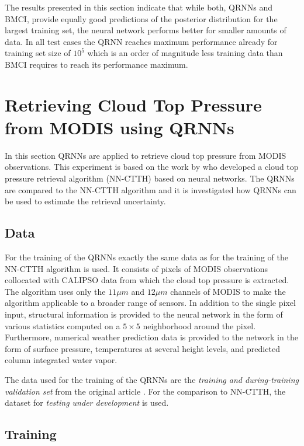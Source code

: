 \documentclass[journal abbreviation, manuscript]{copernicus}
\begin{document}
The results presented in this section indicate that while both, QRNNs and
BMCI, provide equally good predictions of the posterior distribution for the
largest training set, the neural network performs better for smaller amounts
of data. In all test cases the QRNN reaches maximum performance already for
training set size of $10^5$ which is an order of magnitude less training data
than BMCI requires to reach its performance maximum.

\section{Retrieving Cloud Top Pressure from MODIS using QRNNs}
\label{sec:ctp}

In this section QRNNs are applied to retrieve cloud top pressure from MODIS
observations. This experiment is based on the work by \cite{hakansson} who
developed a cloud top pressure retrieval algorithm (NN-CTTH) based on neural
networks. The QRNNs are compared to the NN-CTTH algorithm and it is investigated
how QRNNs can be used to estimate the retrieval uncertainty.

\subsection{Data}

For the training of the QRNNs exactly the same data as for the training of the
NN-CTTH algorithm is used. It consists of pixels of MODIS observations collocated
with CALIPSO data from which the cloud top pressure is extracted. The algorithm
uses only the $11 \unit{\mu m}$ and $12\unit{\mu m}$ channels of MODIS to make the
algorithm applicable to a broader range of sensors. In addition to the single pixel
input, structural information is provided to the neural network in the form of various
statistics computed on a $5 \times 5$ neighborhood around the pixel. Furthermore,
numerical weather prediction data is provided to the network in the form
of surface pressure, temperatures at several height levels, and predicted column
integrated water vapor.

The data used for the training of the QRNNs are the \textit{training and during-training
validation set} from the original article \citep{hakansson}. For the comparison to
NN-CTTH, the dataset for \textit{testing under development} is used.

\subsection{Training}
\end{document}
